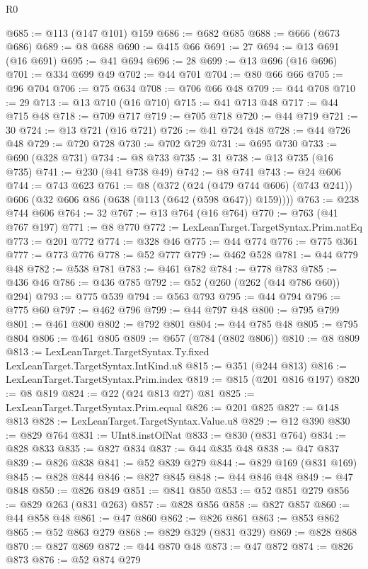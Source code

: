 \begin{lexlean}{R0}
\begin{coremodule}
@685 := @113 (@147 @101) @159
@686 := @682 @685
@688 := @666 (@673 @686)
@689 := @8 @688
@690 := @415 @66
@691 := 27
@694 := @13 @691 (@16 @691)
@695 := @41 @694
@696 := 28
@699 := @13 @696 (@16 @696)
@701 := @334 @699 @49
@702 := @44 @701
@704 := @80 @66 @66
@705 := @96 @704
@706 := @75 @634
@708 := @706 @66 @48
@709 := @44 @708
@710 := 29
@713 := @13 @710 (@16 @710)
@715 := @41 @713 @48
@717 := @44 @715 @48
@718 := @709 @717
@719 := @705 @718
@720 := @44 @719
@721 := 30
@724 := @13 @721 (@16 @721)
@726 := @41 @724 @48
@728 := @44 @726 @48
@729 := @720 @728
@730 := @702 @729
@731 := @695 @730
@733 := @690 (@328 @731)
@734 := @8 @733
@735 := 31
@738 := @13 @735 (@16 @735)
@741 := @230 (@41 @738 @49)
@742 := @8 @741
@743 := @24 @606
@744 := @743 @623
@761 := @8
    (@372
      (@24 (@479 @744 @606) (@743 @241))
      @606
      (@32 @606 @86 (@638 (@113 (@642 (@598 @647)) @159))))
@763 := @238 @744 @606
@764 := 32
@767 := @13 @764 (@16 @764)
@770 := @763 (@41 @767 @197)
@771 := @8 @770
@772 := LexLeanTarget.TargetSyntax.Prim.natEq
@773 := @201 @772
@774 := @328 @46
@775 := @44 @774
@776 := @775 @361
@777 := @773 @776
@778 := @52 @777
@779 := @462 @528
@781 := @44 @779 @48
@782 := @538 @781
@783 := @461 @782
@784 := @778 @783
@785 := @436 @46
@786 := @436 @785
@792 := @52 (@260 (@262 (@44 @786 @60)) @294)
@793 := @775 @539
@794 := @563 @793
@795 := @44 @794
@796 := @775 @60
@797 := @462 @796
@799 := @44 @797 @48
@800 := @795 @799
@801 := @461 @800
@802 := @792 @801
@804 := @44 @785 @48
@805 := @795 @804
@806 := @461 @805
@809 := @657 (@784 (@802 @806))
@810 := @8 @809
@813 := LexLeanTarget.TargetSyntax.Ty.fixed LexLeanTarget.TargetSyntax.IntKind.u8
@815 := @351 (@244 @813)
@816 := LexLeanTarget.TargetSyntax.Prim.index
@819 := @815 (@201 @816 @197)
@820 := @8 @819
@824 := @22 (@24 @813 @27) @81
@825 := LexLeanTarget.TargetSyntax.Prim.equal
@826 := @201 @825
@827 := @148 @813
@828 := LexLeanTarget.TargetSyntax.Value.u8
@829 := @12 @390
@830 := @829 @764
@831 := UInt8.instOfNat
@833 := @830 (@831 @764)
@834 := @828 @833
@835 := @827 @834
@837 := @44 @835 @48
@838 := @47 @837
@839 := @826 @838
@841 := @52 @839 @279
@844 := @829 @169 (@831 @169)
@845 := @828 @844
@846 := @827 @845
@848 := @44 @846 @48
@849 := @47 @848
@850 := @826 @849
@851 := @841 @850
@853 := @52 @851 @279
@856 := @829 @263 (@831 @263)
@857 := @828 @856
@858 := @827 @857
@860 := @44 @858 @48
@861 := @47 @860
@862 := @826 @861
@863 := @853 @862
@865 := @52 @863 @279
@868 := @829 @329 (@831 @329)
@869 := @828 @868
@870 := @827 @869
@872 := @44 @870 @48
@873 := @47 @872
@874 := @826 @873
@876 := @52 @874 @279

\end{coremodule}
\end{lexlean}
